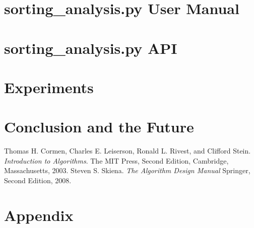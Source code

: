 \documentclass[refman]{scrartcl}
\begin{document}

\newpage
%

%

%

%
%
%
\section{sorting\_analysis.py User Manual}

\section{sorting\_analysis.py API}

\section{Experiments}\label{sec:exp}

\section{Conclusion and the Future}
\newpage
\begin{thebibliography}{9}
        Thomas H. Cormen, Charles E. Leiserson, Ronald L. Rivest, and Clifford Stein. 
        \textit{Introduction to Algorithms}. 
        The MIT Press, Second Edition, Cambridge, Massachusetts, 2003.
        Steven S. Skiena.
        \textit{The Algorithm Design Manual}
        Springer, Second Edition, 2008.
%
\end{thebibliography}

\section{Appendix}

\end{document}
